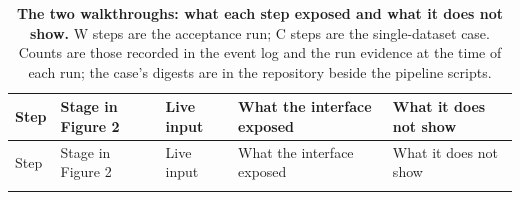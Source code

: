 \documentclass[11pt,a4paper]{article}
\begin{document}
\begin{longtable}[]{@{}
  >{\raggedright\arraybackslash}p{}
  >{\raggedright\arraybackslash}p{}
  >{\raggedright\arraybackslash}p{}
  >{\raggedright\arraybackslash}p{}
  >{\raggedright\arraybackslash}p{}@{}}
\caption{\label{tab:walkthroughs}\textbf{The two walkthroughs: what each step exposed and what
it does not show.} W steps are the acceptance run; C steps are the
single-dataset case. Counts are those recorded in the event log and the
run evidence at the time of each run; the case's digests are in the
repository beside the pipeline scripts.}\tabularnewline
\toprule\noalign{}
\begin{minipage}[b]{\linewidth}\raggedright
Step
\end{minipage} & \begin{minipage}[b]{\linewidth}\raggedright
Stage in Figure 2
\end{minipage} & \begin{minipage}[b]{\linewidth}\raggedright
Live input
\end{minipage} & \begin{minipage}[b]{\linewidth}\raggedright
What the interface exposed
\end{minipage} & \begin{minipage}[b]{\linewidth}\raggedright
What it does not show
\end{minipage} \\
\midrule\noalign{}
\endfirsthead
\toprule\noalign{}
\begin{minipage}[b]{\linewidth}\raggedright
Step
\end{minipage} & \begin{minipage}[b]{\linewidth}\raggedright
Stage in Figure 2
\end{minipage} & \begin{minipage}[b]{\linewidth}\raggedright
Live input
\end{minipage} & \begin{minipage}[b]{\linewidth}\raggedright
What the interface exposed
\end{minipage} & \begin{minipage}[b]{\linewidth}\raggedright
What it does not show
\end{minipage} \\
\midrule\noalign{}
\endhead
\bottomrule\noalign{}
\endlastfoot

\end{longtable}
\end{document}
